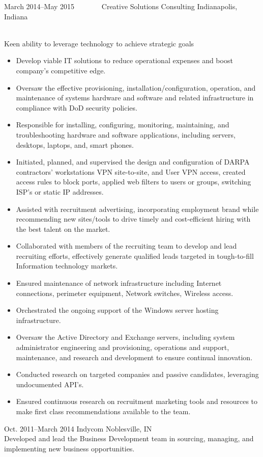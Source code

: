 \documentclass[]{cv-style}          %
\begin{document}
\begin{entrylist}
{\begin{itemize}
\end{itemize}
}
\entry
  {March 2014--May 2015~~~~~~~} 
  {Creative Solutions Consulting}
  {Indianapolis, Indiana}
  {\\
 Keen ability to leverage technology to achieve strategic goals\\
  \begin{itemize}
\item Develop viable IT solutions to reduce operational expenses and boost company's competitive edge.
\item Oversaw the effective provisioning, installation/configuration, operation, and maintenance of systems hardware and software and related infrastructure in compliance with DoD security policies.
\item Responsible for installing, configuring, monitoring, maintaining, and troubleshooting hardware and software applications, including servers, desktops, laptops, and, smart phones.
\item Initiated, planned, and supervised the design and configuration of DARPA contractors' workstations VPN site-to-site, and User VPN access, created access rules to block ports, applied web filters to users or groups, switching ISP's or static IP addresses.
\item Assisted with recruitment advertising, incorporating employment brand while recommending new sites/tools to drive timely and cost-efficient hiring with the best talent on the market.
\item Collaborated with members of the recruiting team to develop and lead recruiting efforts, effectively generate qualified leads targeted in tough-to-fill Information technology markets.
\item Ensured maintenance of network infrastructure including Internet connections, perimeter equipment, Network switches, Wireless access.
\item Orchestrated the ongoing support of the Windows server hosting infrastructure.
\item Oversaw the Active Directory and Exchange servers, including system administrator engineering and provisioning, operations and support, maintenance, and research and development to ensure continual innovation.
\item Conducted research on targeted companies and passive candidates, leveraging undocumented API's.
\item Ensured continuous research on recruitment marketing tools and resources to make first class recommendations available to the team.
  \end{itemize}}
%
%
\entry
  {Oct. 2011--March 2014}
  {Indycom}
  {Noblesville, IN}
  {\\
Developed and lead the Business Development team in sourcing, managing, and implementing new business opportunities.\\

}
\end{entrylist}
\end{document}
